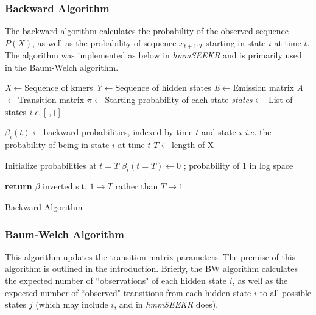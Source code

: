 \subsubsection{Backward Algorithm}
The backward algorithm calculates the probability of the observed sequence $P(X)$, as well as the probability of sequence $x_{t+1:T}$ starting in state $i$ at time $t$. The algorithm was implemented as below in \textit{hmmSEEKR} and is primarily used in the Baum-Welch algorithm. \\
\begin{algorithm}[h]
\DontPrintSemicolon
{}
\SetAlgoLined
\emph{X}$\leftarrow$Sequence of kmers\;
\emph{Y}$\leftarrow$Sequence of hidden states\;
\emph{E}$\leftarrow$Emission matrix\;
\emph{A}$\leftarrow$Transition matrix\;
\emph{$\pi$}$\leftarrow$Starting probability of each state\;
\emph{states}$\leftarrow$ List of states \emph{i.e.} [-,+]\;
\;

$\beta_i(t)\leftarrow$backward probabilities, indexed by time $t$ and state $i$ \emph{i.e.} the probability of being in state $i$ at time $t$\;
$T\leftarrow$length of X\;\; 

Initialize probabilities at $t=T$\;
$\beta_i(t=T)\leftarrow 0$ ; probability of 1 in log space\;\;

\textbf{return} $\beta$ inverted s.t. $1\rightarrow T$ rather than $T \rightarrow 1$\;
 \caption{Backward Algorithm}
 \label{alg:bwd}
\end{algorithm}

\subsubsection{Baum-Welch Algorithm}
This algorithm updates the transition matrix parameters. The premise of this algorithm is outlined in the introduction. Briefly, the BW algorithm calculates the expected number of ``observations" of each hidden state $i$, as well as the expected number of ``observed" transitions from each hidden state $i$ to all possible states $j$ (which may include $i$, and in \textit{hmmSEEKR} does). 

